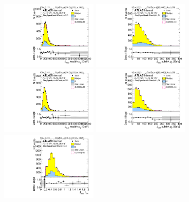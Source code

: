 \begin{figure}[htb!]
\begin{center}
\includegraphics[width=0.41\textwidth,angle=-90]{figures/boosted/Signal/b77_TwoTag_split_Signal_leadHCand_trk0_Pt.pdf}
\includegraphics[width=0.41\textwidth,angle=-90]{figures/boosted/Signal/b77_TwoTag_split_Signal_leadHCand_trk1_Pt.pdf}\\
\includegraphics[width=0.41\textwidth,angle=-90]{figures/boosted/Signal/b77_TwoTag_split_Signal_sublHCand_trk0_Pt.pdf}
\includegraphics[width=0.41\textwidth,angle=-90]{figures/boosted/Signal/b77_TwoTag_split_Signal_sublHCand_trk1_Pt.pdf}\\
\includegraphics[width=0.41\textwidth,angle=-90]{figures/boosted/Signal/b77_TwoTag_split_Signal_leadHCand_trk_dr.pdf}

\end{center}
\end{figure}

